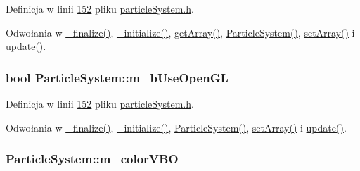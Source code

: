 Definicja w linii \hyperlink{particle_system_8h_source_l00152}{152} pliku \hyperlink{particle_system_8h_source}{particle\-System.\-h}.



Odwołania w \hyperlink{particle_system_8cpp_source_l00205}{\-\_\-finalize()}, \hyperlink{particle_system_8cpp_source_l00123}{\-\_\-initialize()}, \hyperlink{particle_system_8cpp_source_l00346}{get\-Array()}, \hyperlink{particle_system_8cpp_source_l00033}{Particle\-System()}, \hyperlink{particle_system_8cpp_source_l00374}{set\-Array()} i \hyperlink{particle_system_8cpp_source_l00238}{update()}.

\hypertarget{class_particle_system_a5d99413ffc0791e6aa9f02308caf7f1e}{
\subsubsection[{m\-\_\-b\-Use\-Open\-G\-L}]{\setlength{\rightskip}{0pt plus 5cm}bool Particle\-System\-::m\-\_\-b\-Use\-Open\-G\-L\hspace{0.3cm}{\ttfamily [protected]}}}\label{class_particle_system_a5d99413ffc0791e6aa9f02308caf7f1e}


Definicja w linii \hyperlink{particle_system_8h_source_l00152}{152} pliku \hyperlink{particle_system_8h_source}{particle\-System.\-h}.



Odwołania w \hyperlink{particle_system_8cpp_source_l00205}{\-\_\-finalize()}, \hyperlink{particle_system_8cpp_source_l00123}{\-\_\-initialize()}, \hyperlink{particle_system_8cpp_source_l00033}{Particle\-System()}, \hyperlink{particle_system_8cpp_source_l00374}{set\-Array()} i \hyperlink{particle_system_8cpp_source_l00238}{update()}.

\hypertarget{class_particle_system_a96b05c719006c9e3eaed759f54a49c7f}{
\subsubsection[{m\-\_\-color\-V\-B\-O}]{ Particle\-System\-::m\-\_\-color\-V\-B\-O\hspace{0.3cm}{\ttfamily [protected]}}}\label{class_particle_system_a96b05c719006c9e3eaed759f54a49c7f}


